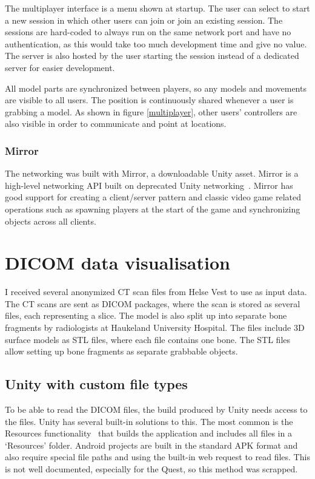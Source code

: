 \documentclass[a4paper]{report}
\begin{document}
The multiplayer interface is a menu shown at startup. The user can select to start a new session in which other users can join or join an existing session. The sessions are hard-coded to always run on the same network port and have no authentication, as this would take too much development time and give no value. The server is also hosted by the user starting the session instead of a dedicated server for easier development.

All model parts are synchronized between players, so any models and movements are visible to all users. The position is continuously shared whenever a user is grabbing a model. As shown in figure \ref{multiplayer}, other users' controllers are also visible in order to communicate and point at locations.


\subsubsection{Mirror}
The networking was built with Mirror, a downloadable Unity asset. Mirror is a high-level networking API built on deprecated Unity networking~\cite{noauthor_mirror_nodate}. Mirror has good support for creating a client/server pattern and classic video game related operations such as spawning players at the start of the game and synchronizing objects across all clients.

\section{DICOM data visualisation}
I received several anonymized CT scan files from Helse Vest to use as input data. The CT scans are sent as DICOM packages, where the scan is stored as several files, each representing a slice.
The model is also split up into separate bone fragments by radiologists at Haukeland University Hospital. The files include 3D surface models as STL files, where each file contains one bone. The STL files allow setting up bone fragments as separate grabbable objects.


\subsection{Unity with custom file types}

To be able to read the DICOM files, the build produced by Unity needs access to the files. Unity has several built-in solutions to this.
The most common is the Resources functionality~\cite{resourcesload_unity_nodate} that builds the application and includes all files in a `Resources' folder. Android projects are built in the standard APK format and also require special file paths and using the built-in web request to read files. This is not well documented, especially for the Quest, so this method was scrapped.
\end{document}
